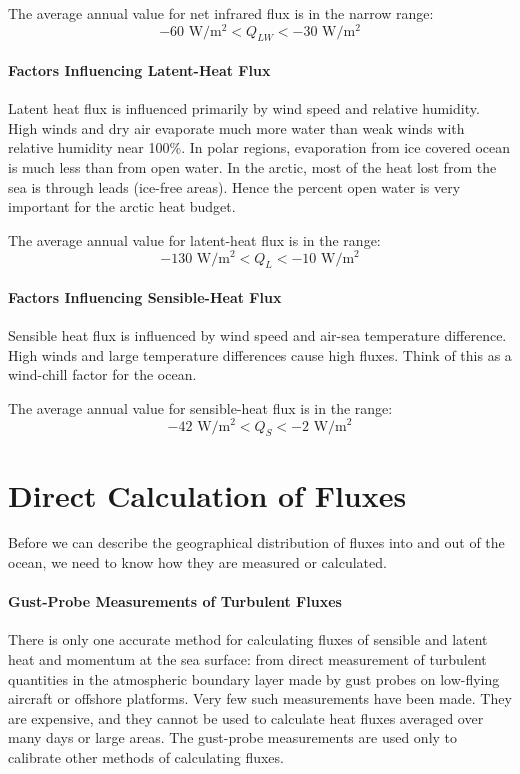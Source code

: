 The average annual value for net infrared flux is in the
narrow range:
\begin{equation}
-60 \text{\ W/m$^2$} < Q_{LW} < -30 \text{\ W/m$^2$}
\end{equation}

\paragraph{Factors Influencing Latent-Heat Flux}
Latent heat flux is influenced primarily by wind speed and
relative humidity. High winds and dry air evaporate much more water than weak winds
with relative humidity near 100\%. In polar regions, evaporation from ice covered
ocean is much less than from open water. In the arctic, most of the heat lost from the
sea is through leads (ice-free areas). Hence the percent open water is
very important for the arctic heat budget.

The average annual value for latent-heat flux is in the range:
\begin{equation}
-130 \text{\ W/m$^2$} < Q_{L} < -10 \text{\ W/m$^2$}
\end{equation}

\paragraph{Factors Influencing Sensible-Heat Flux}
Sensible heat flux is influenced by wind speed and air-sea
temperature difference. High winds and large temperature differences cause high
fluxes. Think of this as a wind-chill factor for the ocean.

The average annual value for sensible-heat flux is in the range:
\begin{equation}
-42 \text{\ W/m$^2$} < Q_{S} < -2 \text{\ W/m$^2$}
\end{equation}

\section[Direct Calculation of Fluxes]{Direct Calculation of Fluxes}
Before we can describe the geographical distribution of fluxes
into and out of the ocean, we need to know how they are measured
or calculated.

\paragraph{Gust-Probe Measurements of Turbulent Fluxes}
There is
only one accurate method for calculating fluxes of sensible and
latent heat and momentum at the sea surface: from direct
measurement of turbulent quantities in the atmospheric boundary
layer made by gust probes on low-flying aircraft or offshore
platforms. Very few such measurements have been made. They are
expensive, and they cannot be used to calculate heat fluxes
averaged over many days or large areas. The gust-probe
measurements are used only to calibrate other methods of
calculating fluxes.

